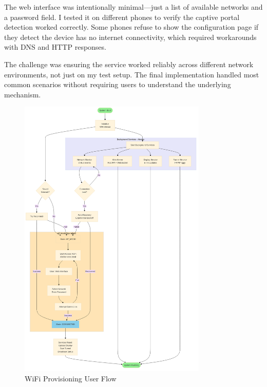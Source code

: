 \documentclass[12pt,a4paper]{report}
\begin{document}
\vspace{0.3cm}

The web interface was intentionally minimal—just a list of available networks and a password field. I tested it on different phones to verify the captive portal detection worked correctly. Some phones refuse to show the configuration page if they detect the device has no internet connectivity, which required workarounds with DNS and HTTP responses.

\vspace{0.3cm}

The challenge was ensuring the service worked reliably across different network environments, not just on my test setup. The final implementation handled most common scenarios without requiring users to understand the underlying mechanism.

\begin{figure}[htbp]
    \centering
    \includegraphics[width=0.8\textwidth]{wifi_provisioning_flow.png}
    \caption{WiFi Provisioning User Flow}
\end{figure}
\end{document}
